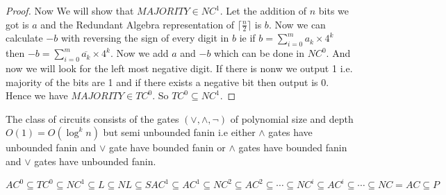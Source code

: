 \begin{proof}
	
	
	Now We will show that $MAJORITY\in NC^1$. Let the addition of $n$ bits we got is $a$ and the Redundant Algebra representation of $\lceil\frac{n}2\rceil$ is $b$. Now we can calculate $-b$ with reversing the sign of every digit in $b$ ie if $b=\sum\limits_{i=0}^{m}a_k\times 4^k$ then $-b=\sum\limits_{i=0}^m\overline{a_k}\times 4^k$. Now we add $a$ and $-b$ which can be done in $NC^0$. And now we will look for the left most negative digit. If there is nonw we output 1 i.e. majority of the bits are 1 and if there exists a negative bit then output is 0. Hence we have $MAJORITY\in TC^0$. So $TC^0\subseteq NC^1$.
\end{proof}

\begin{definition}[$SAC^k$]
	The class of circuits consists of the gates $(\vee,\wedge,\neg)$  of polynomial size and depth $O(1)=O(\log^k n)$ but semi unbounded fanin i.e either $\wedge$ gates have unbounded fanin and $\vee$ gate have bounded fanin or $\wedge$ gates have bounded fanin and $\vee$ gates have unbounded fanin.
\end{definition}
\begin{theorem}
	$AC^0\subseteq TC^0\subseteq NC^1\subseteq L\subseteq NL\subseteq  SAC^1\subseteq AC^1\subseteq NC^2\subseteq AC^2\subseteq \cdots \subseteq NC^i\subseteq AC^i\subseteq \cdots \subseteq NC=AC\subseteq P$
\end{theorem}
